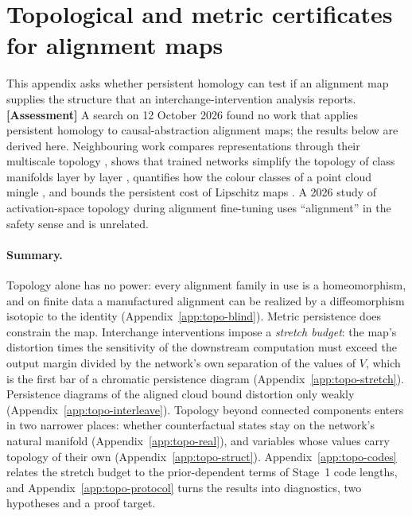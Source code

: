 \documentclass[11pt,a4paper]{article}
\newcommand{\evl}[2]{{\small\bfseries\color{#1}[#2]}}
\newcommand{\LAssess}{\evl{cassess}{Assessment}}
\begin{document}
\section{Topological and metric certificates for alignment maps}
\label{app:topo}
\renewcommand{\theequation}{\thesection.\arabic{equation}}
\setcounter{equation}{0}
\providecommand{\Lip}{\operatorname{Lip}}
\providecommand{\Dist}{\operatorname{Dist}}
\providecommand{\Dgm}{\operatorname{Dgm}}
\providecommand{\VR}{\mathrm{VR}}
\providecommand{\sep}{\operatorname{sep}}

This appendix asks whether persistent homology can test if an alignment map
supplies the structure that an interchange-intervention analysis reports.
\LAssess{} A search on 12 October 2026 found no work that applies persistent
homology to causal-abstraction alignment maps; the results below are derived
here. Neighbouring work compares representations through their multiscale
topology \cite{barannikov2022}, shows that trained networks simplify the
topology of class manifolds layer by layer \cite{naitzat2020}, quantifies how
the colour classes of a point cloud mingle \cite{cultrera2025chromatic}, and
bounds the persistent cost of Lipschitz maps \cite{gozzi2025}. A 2026 study of
activation-space topology during alignment fine-tuning \cite{phalign2026} uses
``alignment'' in the safety sense and is unrelated.

\paragraph{Summary.} Topology alone has no power: every alignment family in
use is a homeomorphism, and on finite data a manufactured alignment can be
realized by a diffeomorphism isotopic to the identity
(Appendix~\ref{app:topo-blind}). Metric persistence does constrain the map.
Interchange interventions impose a \emph{stretch budget}: the map's distortion
times the sensitivity of the downstream computation must exceed the output
margin divided by the network's own separation of the values of $V$, which is
the first bar of a chromatic persistence diagram
(Appendix~\ref{app:topo-stretch}). Persistence diagrams of the aligned cloud
bound distortion only weakly (Appendix~\ref{app:topo-interleave}). Topology
beyond connected components enters in two narrower places: whether
counterfactual states stay on the network's natural manifold
(Appendix~\ref{app:topo-real}), and variables whose values carry topology of
their own (Appendix~\ref{app:topo-struct}).
Appendix~\ref{app:topo-codes} relates the stretch budget to the
prior-dependent terms of Stage~1 code lengths, and
Appendix~\ref{app:topo-protocol} turns the results into diagnostics, two
hypotheses and a proof target.
\end{document}

